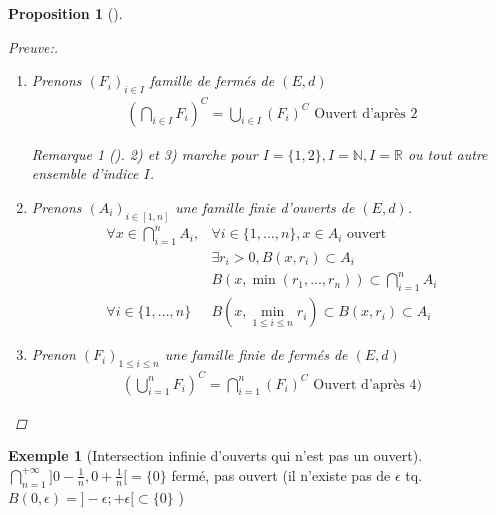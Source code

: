 \documentclass{article}
\theoremstyle{plain}%
\newtheorem{prop}[thm]{Proposition}
\theoremstyle{definition}
\newtheorem{exmp}{Exemple}[section]
\theoremstyle{remark}
\newtheorem*{rem}{Remarque}
\begin{document}
\begin{prop}[]
\begin{proof}[Preuve:]
\begin{enumerate}
            \item Prenons $ (F_i)_{i \in I} $  famille de fermés de $ (E,d) $ 
            \begin{align*}
                (\bigcap_{i \in I}^{}F_i)^C = \bigcup_{i \in I}^{}(F_i)^C \text{ Ouvert d'après 2}
            \end{align*}
            
            \begin{rem}[]
                2) et 3) marche pour $ I=\{1,2\}, I=\mathbb{N}, I=\mathbb{R} $ ou tout autre ensemble d'indice $ I $.
            \end{rem}
            
            \item Prenons $ (A_i)_{i \in [1,n]} $ une famille finie d'ouverts de $ (E,d) $. 
            \begin{align*}
                \forall x \in \bigcap_{i=1}^{n}A_i, & \forall i \in \{1,\dots, n\}, x \in A_i \text{ ouvert} \\
                & \exists r_i > 0, B(x,r_i) \subset A_i\\ 
                & B(x, \min (r_1, ..., r_n)) \subset \bigcap_{i=1}^{n}A_i \\
                \forall i \in \{1, ..., n\} & B(x, \min _{1 \leq i \leq n} r_i) \subset B(x,r_i) \subset A_i
            \end{align*}
    
            \item Prenon $ (F_i)_{1 \leq i \leq n} $ une famille finie de fermés de $ (E,d) $ 
            \begin{align*}
                (\bigcup_{i=1}^{n}F_i)^C = \bigcap_{i=1}^{n}(F_i)^C \text{ Ouvert d'après 4)}
            \end{align*}
        \end{enumerate}
    \end{proof}
\end{prop}
\begin{exmp}[Intersection infinie d'ouverts qui n'est pas un ouvert]
    $ \bigcap_{n=1}^{+\infty }]0 - \frac{1}{n}, 0 + \frac{1}{n}[ = \{0\} $ fermé, pas ouvert (il n'existe pas de $ \epsilon  $ tq. $ B(0, \epsilon ) = ]-\epsilon ; +\epsilon[ \subset \{0\} $  ) 
\end{exmp}
\end{document}
